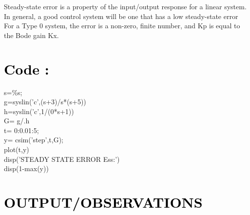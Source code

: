 \documentclass[12pt]{article}
\begin{document}
Steady-state error is a property of the input/output response for a linear system. In general, a good control system will be one that has a low steady-state error
For a Type 0 system, the error is a non-zero, finite number, and Kp is equal to the Bode gain Kx. \par

\section*{\textcolor{black}{Code :}}

   s=\%s;\\ 
   g=syslin('c',(s+3)/s*(s+5))\\
   h=syslin('c',1/(0*s+1))\\
   G= g/.h\\
   t= 0:0.01:5;\\
   y= csim('step',t,G);\\
   plot(t,y)\\
   disp('STEADY STATE ERROR Ess:')\\
   disp(1-max(y)) \par 

\section*{\textcolor{black}{OUTPUT/OBSERVATIONS}}
\end{document}

